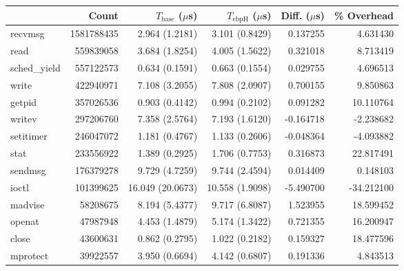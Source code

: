 \begin{tabular}{>{\ttfamily}lrrrrr}
\toprule
\multicolumn{1}{l}{System Call} &       Count & $T_\text{base}$ ($\mu$s) & $T_\text{ebpH}$ ($\mu$s) &  Diff. ($\mu$s) &  \% Overhead \\
\midrule
                        recvmsg &  1581788435 &           2.964 (1.2181) &           3.101 (0.8429) &        0.137255 &     4.631430 \\
                           read &   559839058 &           3.684 (1.8254) &           4.005 (1.5622) &        0.321018 &     8.713419 \\
                   sched\_yield &   557122573 &           0.634 (0.1591) &           0.663 (0.1554) &        0.029755 &     4.696513 \\
                          write &   422940971 &           7.108 (3.2055) &           7.808 (2.0907) &        0.700155 &     9.850863 \\
                         getpid &   357026536 &           0.903 (0.4142) &           0.994 (0.2102) &        0.091282 &    10.110764 \\
                         writev &   297206760 &           7.358 (2.5764) &           7.193 (1.6120) &       -0.164718 &    -2.238682 \\
                      setitimer &   246047072 &           1.181 (0.4767) &           1.133 (0.2606) &       -0.048364 &    -4.093882 \\
                           stat &   233556922 &           1.389 (0.2925) &           1.706 (0.7753) &        0.316873 &    22.817491 \\
                        sendmsg &   176379278 &           9.729 (4.7259) &           9.744 (2.4594) &        0.014409 &     0.148103 \\
                          ioctl &   101399625 &         16.049 (20.0673) &          10.558 (1.9098) &       -5.490700 &   -34.212100 \\
                        madvise &    58208675 &           8.194 (5.4377) &           9.717 (6.8087) &        1.523955 &    18.599452 \\
                         openat &    47987948 &           4.453 (1.4879) &           5.174 (1.3422) &        0.721355 &    16.200947 \\
                          close &    43600631 &           0.862 (0.2795) &           1.022 (0.2182) &        0.159327 &    18.477596 \\
                       mprotect &    39922557 &           3.950 (0.6694) &           4.142 (0.6807) &        0.191336 &     4.843513 \\

\end{tabular}
